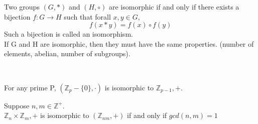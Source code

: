 \begin{definition}
    Two groups \((G, *)\) and \((H, \circ)\) are isomorphic if and only if there exists a bijection \(f: G\to H\) such that forall \(x, y \in G\), \[f(x*y) = f(x)\circ f(y)\]
    Such a bijection is called an isomorphism.\\
    If G and H are isomorphic, then they must have the same properties. (number of elements, abelian, number of subgroups).\\
\end{definition}\\

\begin{theorm}
    For any prime P, \((\mathbb Z_p - \{0\}, \cdot)\) is isomorphic to \(\mathbb Z_{p-1}, +\).
\end{theorm}
\begin{theorm}
    Suppose \(n,m \in \mathbb Z^+\).\\
    \(\mathbb Z_n \times \mathbb Z_m, +\) is isomorphic to \((\mathbb Z_{nm}, +)\) if and only if \(gcd(n,m) = 1\)
\end{theorm}
